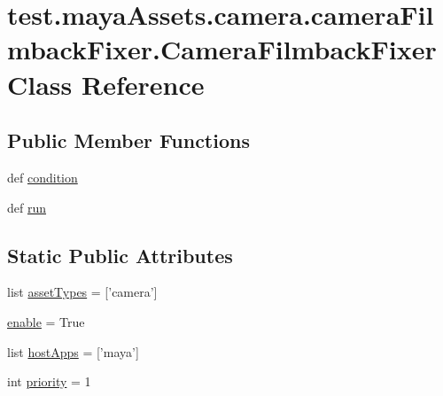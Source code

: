 \hypertarget{classtest_1_1mayaAssets_1_1camera_1_1cameraFilmbackFixer_1_1CameraFilmbackFixer}{\section{test.\-maya\-Assets.\-camera.\-camera\-Filmback\-Fixer.\-Camera\-Filmback\-Fixer \-Class \-Reference}
\label{d7/d76/classtest_1_1mayaAssets_1_1camera_1_1cameraFilmbackFixer_1_1CameraFilmbackFixer}
}
\subsection*{\-Public \-Member \-Functions}
\begin{DoxyCompactItemize}
\item 
def \hyperlink{classtest_1_1mayaAssets_1_1camera_1_1cameraFilmbackFixer_1_1CameraFilmbackFixer_a30b14d46bab356aa84f72a7ca427825a}{condition}
\item 
def \hyperlink{classtest_1_1mayaAssets_1_1camera_1_1cameraFilmbackFixer_1_1CameraFilmbackFixer_a72980cd4d839422bf89794643880f1cf}{run}
\end{DoxyCompactItemize}
\subsection*{\-Static \-Public \-Attributes}
\begin{DoxyCompactItemize}
\item 
list \hyperlink{classtest_1_1mayaAssets_1_1camera_1_1cameraFilmbackFixer_1_1CameraFilmbackFixer_a15e4dd8a305fcb599d999c86a0b4c2ef}{asset\-Types} = \mbox{[}'camera'\mbox{]}
\item 
\hyperlink{classtest_1_1mayaAssets_1_1camera_1_1cameraFilmbackFixer_1_1CameraFilmbackFixer_a7e2bf300b79b73097ce9eef5c4f119a0}{enable} = \-True
\item 
list \hyperlink{classtest_1_1mayaAssets_1_1camera_1_1cameraFilmbackFixer_1_1CameraFilmbackFixer_a8665d839c27bab125af06c7b12d4c866}{host\-Apps} = \mbox{[}'maya'\mbox{]}
\item 
int \hyperlink{classtest_1_1mayaAssets_1_1camera_1_1cameraFilmbackFixer_1_1CameraFilmbackFixer_a4e5fca083acb0dd3ba64ca9c83136199}{priority} = 1
\end{DoxyCompactItemize}


